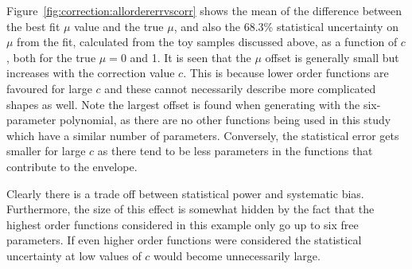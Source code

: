 Figure~\ref{fig:correction:allordererrvscorr} shows the mean of the difference
between the best fit $\mu$ value and the true $\mu$, and also the 68.3\%
statistical uncertainty on $\mu$ from the fit, calculated from the toy
samples discussed above, as a function of $c$,
both for the true $\mu=0$ and 1. It is seen that the $\mu$ offset
is generally small but increases with the correction value $c$. This is
because lower order functions are favoured for large $c$ and these cannot
necessarily describe more complicated shapes as well. Note the largest
offset is found when generating with the six-parameter polynomial, as there
are no other functions being used in this study which have a similar number
of parameters.
Conversely, the
statistical error gets smaller for large $c$ as there tend to be less parameters
in the functions that contribute to the envelope.

Clearly there is a trade off between statistical power and systematic bias. Furthermore, the
size of this effect is somewhat hidden by the fact that the highest order functions considered
in this example only go up to six free parameters. If even higher order functions were considered
the statistical uncertainty at low values of $c$ would become unnecessarily large.


